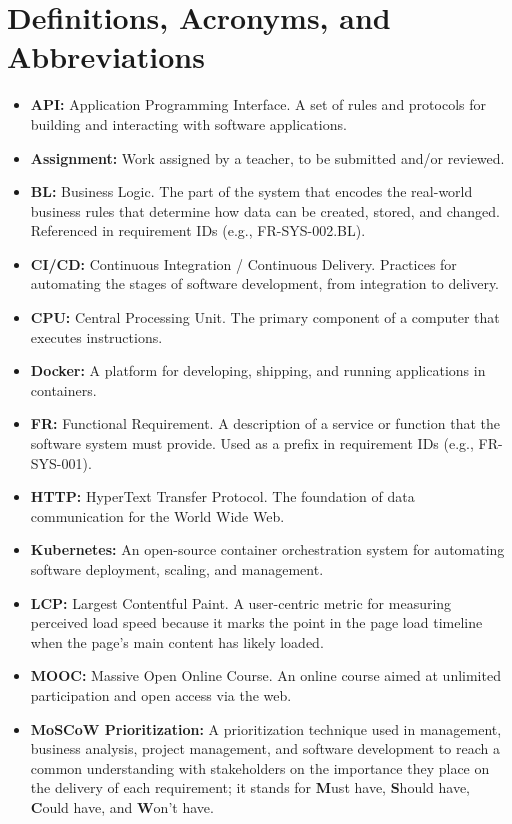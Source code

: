 \clearpage

\section{Definitions, Acronyms, and Abbreviations}

\begin{justify}
\begin{itemize}
\item \textbf{API:} Application Programming Interface. A set of rules and protocols for building and interacting with software applications.
\item \textbf{Assignment:} Work assigned by a teacher, to be submitted and/or reviewed.
\item \textbf{BL:} Business Logic. The part of the system that encodes the real-world business rules that determine how data can be created, stored, and changed. Referenced in requirement IDs (e.g., FR-SYS-002.BL).
\item \textbf{CI/CD:} Continuous Integration / Continuous Delivery. Practices for automating the stages of software development, from integration to delivery.
\item \textbf{CPU:} Central Processing Unit. The primary component of a computer that executes instructions.
\item \textbf{Docker:} A platform for developing, shipping, and running applications in containers.
\item \textbf{FR:} Functional Requirement. A description of a service or function that the software system must provide. Used as a prefix in requirement IDs (e.g., FR-SYS-001).
\item \textbf{HTTP:} HyperText Transfer Protocol. The foundation of data communication for the World Wide Web.
\item \textbf{Kubernetes:} An open-source container orchestration system for automating software deployment, scaling, and management.
\item \textbf{LCP:} Largest Contentful Paint. A user-centric metric for measuring perceived load speed because it marks the point in the page load timeline when the page's main content has likely loaded.
\item \textbf{MOOC:} Massive Open Online Course. An online course aimed at unlimited participation and open access via the web.
\item \textbf{MoSCoW Prioritization:} A prioritization technique used in management, business analysis, project management, and software development to reach a common understanding with stakeholders on the importance they place on the delivery of each requirement; it stands for \textbf{M}ust have, \textbf{S}hould have, \textbf{C}ould have, and \textbf{W}on't have.

\end{itemize}
\end{justify}
